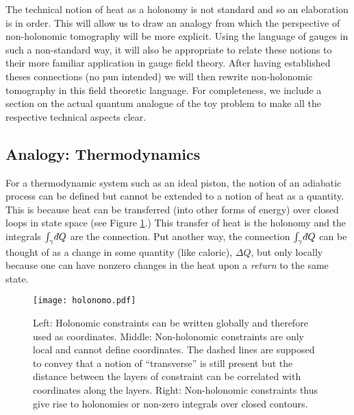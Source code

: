 \documentclass[pra, 10pt, notitlepage, twocolumn]{revtex4-1}
\def\dbar{{\mathchar'26\mkern-12mu d}}
\begin{document}
The technical notion of heat as a holonomy is not standard and so an elaboration is in order.
This will allow us to draw an analogy from which the perspective of non-holonomic tomography will be more explicit.
Using the language of gauges in such a non-standard way, it will also be appropriate to relate these notions to their more familiar application in gauge field theory.
After having established theses connections (no pun intended) we will then rewrite non-holonomic tomography in this field theoretic language.
For completeness, we include a section on the actual quantum analogue of the toy problem to make all the respective technical aspects clear.




\subsection{Analogy: Thermodynamics}\label{OMGthermo}

For a thermodynamic system such as an ideal piston, the notion of an adiabatic process can be defined but cannot be extended to a notion of heat as a quantity.
This is because heat can be transferred (into other forms of energy) over closed loops in state space (see Figure \ref{nonholo}.)
This transfer of heat is the holonomy and the integrals $\int_\gamma \dbar Q$ are the connection.
Put another way, the connection $\int_\gamma \dbar Q$ can be thought of as a change in some quantity (like caloric), $\Delta Q$,
but only locally because one can have nonzero changes in the heat upon a \emph{return} to the same state.


\begin{widetext}

\begin{figure}[h!]
\centering
\texttt{[image: holonomo.pdf]}
\caption{Left: Holonomic constraints can be written globally and therefore used as coordinates.
Middle: Non-holonomic constraints are only local and cannot define coordinates.
The dashed lines are supposed to convey that a notion of ``transverse'' is still present
but the distance between the layers of constraint can be correlated with coordinates along the layers.
Right: Non-holonomic constraints thus give rise to holonomies or non-zero integrals over closed contours.}\label{nonholo}
\end{figure}

\end{widetext}
\end{document}

